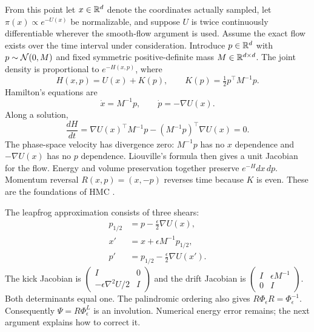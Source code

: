 From this point let $x\in\mathbb{R}^d$ denote the coordinates actually sampled,
let $\pi(x)\propto e^{-U(x)}$ be normalizable, and suppose $U$ is twice
continuously differentiable wherever the smooth-flow argument is used.
Assume the exact flow exists over the time interval under consideration.
Introduce $p\in\mathbb{R}^d$ with $p\sim\mathcal{N}(0,M)$ and fixed symmetric
positive-definite mass $M\in\mathbb{R}^{d\times d}$. The joint density
is proportional to $e^{-H(x,p)}$, where
\begin{equation}
 H(x,p)=U(x)+K(p),\qquad K(p)=\tfrac12p^\top M^{-1}p.
 \label{eq:bf-modern-hamiltonian}
\end{equation}
Hamilton's equations are
\begin{equation}
 \dot x=M^{-1}p,\qquad \dot p=-\nabla U(x).
 \label{eq:bf-modern-hamilton-equations}
\end{equation}
Along a solution,
\begin{equation}
 \frac{dH}{dt}=\nabla U(x)^\top M^{-1}p
               -(M^{-1}p)^\top\nabla U(x)=0.
 \label{eq:bf-modern-energy-conservation}
\end{equation}
The phase-space velocity has divergence zero: $M^{-1}p$ has no $x$
dependence and $-\nabla U(x)$ has no $p$ dependence. Liouville's formula
then gives a unit Jacobian for the flow. Energy and volume preservation
together preserve $e^{-H}dx\,dp$. Momentum reversal
$R(x,p)=(x,-p)$ reverses time because $K$ is even. These are the foundations
of HMC \citep[Sections 2 and 3]{neal2011mcmc}.

The leapfrog approximation consists of three shears:
\begin{align}
 p_{1/2}&=p-\tfrac\epsilon2\nabla U(x),\\
 x'&=x+\epsilon M^{-1}p_{1/2},\\
 p'&=p_{1/2}-\tfrac\epsilon2\nabla U(x').
 \label{eq:bf-modern-leapfrog}
\end{align}
The kick Jacobian is
$\left(\begin{smallmatrix}I&0\\-\epsilon\nabla^2U/2&I\end{smallmatrix}\right)$
and the drift Jacobian is
$\left(\begin{smallmatrix}I&\epsilon M^{-1}\\0&I\end{smallmatrix}\right)$.
Both determinants equal one. The palindromic ordering also gives
$R\Phi_\epsilon R=\Phi_\epsilon^{-1}$. Consequently
$\Psi=R\Phi_\epsilon^L$ is an involution. Numerical energy error remains;
the next argument explains how to correct it.

